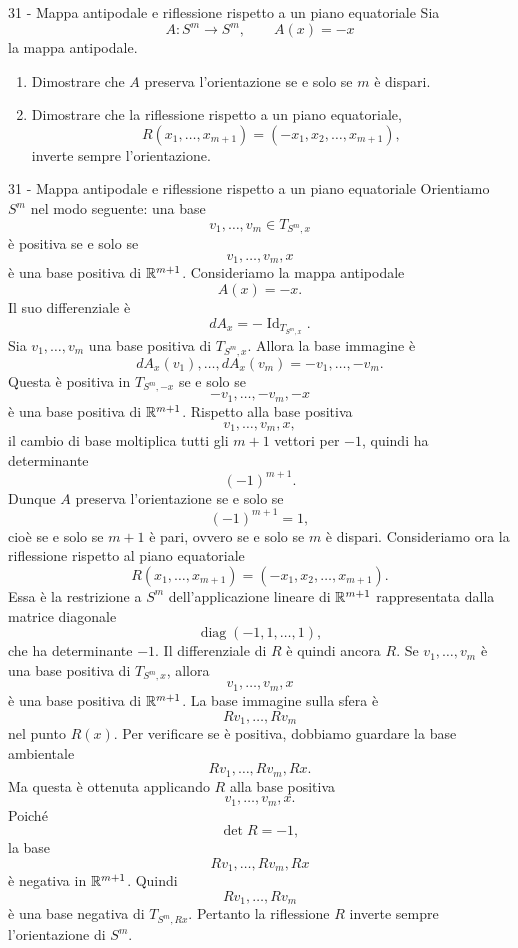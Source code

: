 \documentclass[a4paper]{article}
\begin{document}
\begin{snippetexercise}{31 - Mappa antipodale e riflessione rispetto a un
    piano equatoriale}
    Sia
    \[
        A\colon S^m\longrightarrow S^m,
        \qquad
        A(x)=-x
    \]
    la mappa antipodale.
    \begin{enumerate}
        \item Dimostrare che \(A\) preserva l'orientazione se e solo se
            \(m\) è dispari.
        \item Dimostrare che la riflessione rispetto a un piano equatoriale,
            \[
                R(x_1,\ldots,x_{m+1})
                =
                (-x_1,x_2,\ldots,x_{m+1}),
            \]
            inverte sempre l'orientazione.
    \end{enumerate}
\end{snippetexercise}

\begin{snippetsolution}{31 - Mappa antipodale e riflessione rispetto a un
    piano equatoriale}
    Orientiamo \(S^m\) nel modo seguente: una base
    \[
        v_1,\ldots,v_m\in T_{S^m,x}
    \]
    è positiva se e solo se
    \[
        v_1,\ldots,v_m,x
    \]
    è una base positiva di \(\mathbb{R}^{m+1}\).
    Consideriamo la mappa antipodale
    \[
        A(x)=-x.
    \]
    Il suo differenziale è
    \[
        dA_x=-\operatorname{Id}_{T_{S^m,x}}.
    \]
    Sia \(v_1,\ldots,v_m\) una base positiva di \(T_{S^m,x}\). Allora la base immagine è
    \[
        dA_x(v_1),\ldots,dA_x(v_m)
        =
        -v_1,\ldots,-v_m.
    \]
    Questa è positiva in \(T_{S^m,-x}\) se e solo se
    \[
        -v_1,\ldots,-v_m,-x
    \]
    è una base positiva di \(\mathbb{R}^{m+1}\). Rispetto alla base positiva
    \[
        v_1,\ldots,v_m,x,
    \]
    il cambio di base moltiplica tutti gli \(m+1\) vettori per \(-1\), quindi ha determinante
    \[
        (-1)^{m+1}.
    \]
    Dunque \(A\) preserva l'orientazione se e solo se
    \[
        (-1)^{m+1}=1,
    \]
    cioè se e solo se \(m+1\) è pari, ovvero se e solo se \(m\) è dispari.
    Consideriamo ora la riflessione rispetto al piano equatoriale
    \[
        R(x_1,\ldots,x_{m+1})
        =
        (-x_1,x_2,\ldots,x_{m+1}).
    \]
    Essa è la restrizione a \(S^m\) dell'applicazione lineare di \(\mathbb{R}^{m+1}\) rappresentata dalla matrice diagonale
    \[
        \operatorname{diag}(-1,1,\ldots,1),
    \]
    che ha determinante \(-1\). Il differenziale di \(R\) è quindi ancora \(R\). Se \(v_1,\ldots,v_m\) è una base positiva di \(T_{S^m,x}\), allora
    \[
        v_1,\ldots,v_m,x
    \]
    è una base positiva di \(\mathbb{R}^{m+1}\). La base immagine sulla sfera è
    \[
        Rv_1,\ldots,Rv_m
    \]
    nel punto \(R(x)\). Per verificare se è positiva, dobbiamo guardare la base ambientale
    \[
        Rv_1,\ldots,Rv_m,Rx.
    \]
    Ma questa è ottenuta applicando \(R\) alla base positiva
    \[
        v_1,\ldots,v_m,x.
    \]
    Poiché
    \[
        \det R=-1,
    \]
    la base
    \[
        Rv_1,\ldots,Rv_m,Rx
    \]
    è negativa in \(\mathbb{R}^{m+1}\). Quindi
    \[
        Rv_1,\ldots,Rv_m
    \]
    è una base negativa di \(T_{S^m,Rx}\). Pertanto la riflessione \(R\) inverte sempre l'orientazione di \(S^m\).
\end{snippetsolution}
\end{document}
